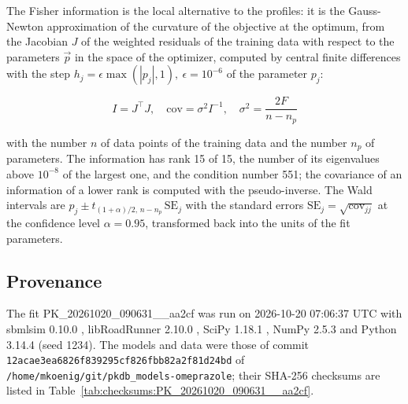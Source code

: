 The Fisher information is the local alternative to the profiles: it is the Gauss-Newton approximation of the curvature of the objective at the optimum, from the Jacobian $J$ of the weighted residuals of the training data with respect to the parameters $\vec{p}$ in the space of the optimizer, computed by central finite differences with the step $h_j = \epsilon \max(|p_j|, 1),\ \epsilon = 10^{-6}$ of the parameter $p_j$:

\begin{equation}
I = J^\top J, \quad \mathrm{cov} = \sigma^2 I^{-1}, \quad \sigma^2 = \frac{2 F}{n - n_p}
\end{equation}

with the number $n$ of data points of the training data and the number $n_p$ of parameters. The information has rank 15 of 15, the number of its eigenvalues above $10^{-8}$ of the largest one, and the condition number 551; the covariance of an information of a lower rank is computed with the pseudo-inverse. The Wald intervals are $\hat{p}_j \pm t_{(1+\alpha)/2,\, n-n_p}\, \mathrm{SE}_j$ with the standard errors $\mathrm{SE}_j = \sqrt{\mathrm{cov}_{jj}}$ at the confidence level $\alpha = 0.95$, transformed back into the units of the fit parameters.

\subsection{Provenance}

The fit PK\_20261020\_090631\_\_aa2cf was run on 2026-10-20 07:06:37 UTC with sbmlsim 0.10.0 \cite{Koenig2026_sbmlsim}, libRoadRunner 2.10.0 \cite{Welsh2023}, SciPy 1.18.1 \cite{Virtanen2020}, NumPy 2.5.3 \cite{Harris2020} and Python 3.14.4 (seed 1234). The models and data were those of commit \texttt{12acae3ea6826f839295cf826fbb82a2f81d24bd} of \texttt{/home/mkoenig/git/pkdb\_models-omeprazole}; their SHA-256 checksums are listed in Table~\ref{tab:checksums:PK_20261020_090631__aa2cf}.

